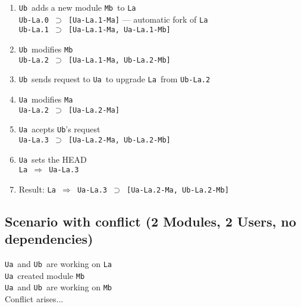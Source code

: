\documentclass[10pt]{article}
\def\Ua{{\tt Ua}}
\def\Ub{{\tt Ub}}
\def\La{{\tt La}}
\def\Ma{{\tt Ma}}
\def\Mb{{\tt Mb}}
\def\headsto{${\Longrightarrow}$ }
\def\hto{\headsto}
\def\eq{${\supset}$ }
\begin{document}
		\begin{enumerate}
			\item{\Ub\ adds a new module \Mb\ to \La\\
				{\tt Ub-La.0 \eq [Ua-La.1-Ma]} --- automatic fork of \La\\
				{\tt Ub-La.1 \eq [Ua-La.1-Ma, Ua-La.1-Mb]}
			}
			\item{\Ub\ modifies \Mb\\
				{\tt Ub-La.2 \eq [Ua-La.1-Ma, Ub-La.2-Mb]}
			}
			\item{\Ub\ sends request to \Ua\ to upgrade \La\ from {\tt Ub-La.2}}
			\item{\Ua\ modifies \Ma\\
				{\tt Ua-La.2 \eq [Ua-La.2-Ma]}
			}
			\item{\Ua\ acepts \Ub's request\\
				{\tt Ua-La.3 \eq [Ua-La.2-Ma, Ub-La.2-Mb]}
			}
			\item{\Ua\ sets the HEAD\\
				{\tt La \hto Ua-La.3}
			}
			\item{Result: {\tt La \hto Ua-La.3 \eq [Ua-La.2-Ma, Ub-La.2-Mb]}}
		\end{enumerate}

	\subsection{Scenario with conflict (2 Modules, 2 Users, no dependencies)}

		\Ua\ and \Ub\ are working on \La\\ 
		\Ua\ created module \Mb\\
		\Ua\ and \Ub\ are working on \Mb\\
		Conflict arises...
\end{document}
